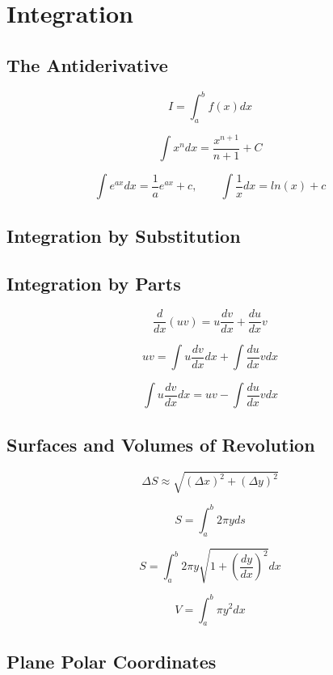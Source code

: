 \chapter{Integration}
\section{The Antiderivative}

\begin{equation*}
    I = \int_{a}^{b} f(x)dx
\end{equation*}

\begin{equation*}
    \int x^{n}dx = \frac{x^{n+1}}{n+1} + C
\end{equation*}

\[\int e^{ax}dx = \frac{1}{a}e^{ax} + c, \qquad \int \frac{1}{x}dx = ln(x) + c\]

\section{Integration by Substitution}
\section{Integration by Parts}

\begin{equation*}
    \frac{d}{dx}(uv) = u \frac{dv}{dx} + \frac{du}{dx} v
\end{equation*}

\begin{equation*}
    uv = \int u \frac{dv}{dx} dx + \int \frac{du}{dx}vdx
\end{equation*}
    
\begin{equation*}
    \int u \frac{dv}{dx} dx = uv - \int \frac{du}{dx}vdx
\end{equation*}

\section{Surfaces and Volumes of Revolution}

\begin{equation*}
    \Delta S \approx \sqrt{(\Delta x)^{2} + (\Delta y)^{2}}
\end{equation*}

\begin{equation*}
    S = \int_{a}^{b} 2 \pi y ds
\end{equation*}

\begin{equation*}
    S = \int_{a}^{b} 2 \pi y \sqrt{1 + \left(\frac{dy}{dx}\right)^{2}}dx
\end{equation*}

\begin{equation*}
    V = \int_{a}^{b} \pi y^{2} dx
\end{equation*}

\section{Plane Polar Coordinates}